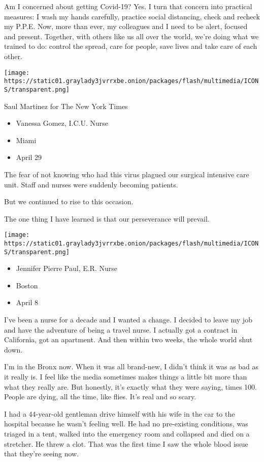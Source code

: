 Am I concerned about getting Covid-19? Yes. I turn that concern into
practical measures: I wash my hands carefully, practice social
distancing, check and recheck my P.P.E. Now, more than ever, my
colleagues and I need to be alert, focused and present. Together, with
others like us all over the world, we're doing what we trained to do:
control the spread, care for people, save lives and take care of each
other.

\texttt{[image: https://static01.graylady3jvrrxbe.onion/packages/flash/multimedia/ICONS/transparent.png]}

Saul Martinez for The New York Times

\begin{itemize}
\tightlist
\item
  Vanessa Gomez, I.C.U. Nurse
\item
  Miami
\item
  April 29
\end{itemize}

The fear of not knowing who had this virus plagued our surgical
intensive care unit. Staff and nurses were suddenly becoming patients.

But we continued to rise to this occasion.

The one thing I have learned is that our perseverance will prevail.

\texttt{[image: https://static01.graylady3jvrrxbe.onion/packages/flash/multimedia/ICONS/transparent.png]}

\begin{itemize}
\tightlist
\item
  Jennifer Pierre Paul, E.R. Nurse
\item
  Boston
\item
  April 8
\end{itemize}

I've been a nurse for a decade and I wanted a change. I decided to leave
my job and have the adventure of being a travel nurse. I actually got a
contract in California, got an apartment. And then within two weeks, the
whole world shut down.

I'm in the Bronx now. When it was all brand-new, I didn't think it was
as bad as it really is. I feel like the media sometimes makes things a
little bit more than what they really are. But honestly, it's exactly
what they were saying, times 100. People are dying, all the time, like
flies. It's real and so scary.

I had a 44-year-old gentleman drive himself with his wife in the car to
the hospital because he wasn't feeling well. He had no pre-existing
conditions, was triaged in a tent, walked into the emergency room and
collapsed and died on a stretcher. He threw a clot. That was the first
time I saw the whole blood issue that they're seeing now.

